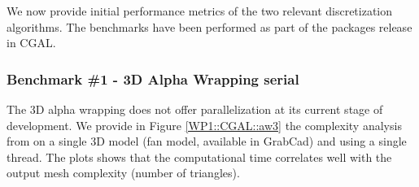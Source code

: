 We now provide initial performance metrics of the two relevant discretization algorithms. The benchmarks have been performed as part of the packages release in CGAL.



\subsubsection{Benchmark \#1 - 3D Alpha Wrapping serial}


The 3D alpha wrapping does not offer parallelization at its current stage of development. We provide in Figure \ref{WP1::CGAL::aw3} the complexity analysis from \cite{portaneri_alpha_2022} on a single 3D model (fan model, available in GrabCad) and using a single thread. The plots shows that the computational time correlates well with the output mesh complexity (number of triangles).


